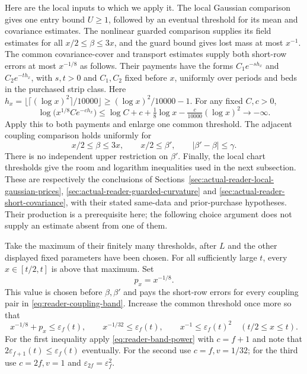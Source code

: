 Here are the local inputs to which we apply it. The local Gaussian
comparison gives one entry bound $U\ge1$, followed by an eventual
threshold for its mean and covariance estimates. The nonlinear
guarded comparison supplies its field estimates for all
$x/2\le\beta\le3x$, and the guard bound gives lost mass at most
$x^{-1}$. The common covariance-cover and transport estimates
supply both short-row errors at most $x^{-1/8}$ as follows. Their
payments have the forms $C_1e^{-s h_x}$ and $C_2e^{-t h_x}$, with
$s,t>0$ and $C_1,C_2$ fixed before $x$, uniformly over periods and
beds in the purchased strip class. Here
$h_x=\lfloor\lceil(\log x)^2\rceil/10000\rfloor
\ge(\log x)^2/10000-1$. For any fixed $C,c>0$,
\[
 \log\bigl(x^{1/8}Ce^{-c h_x}\bigr)
 \le\log C+c+\tfrac18\log x-\tfrac c{10000}(\log x)^2
 \longrightarrow-\infty.
\]
Apply this to both payments and enlarge one common threshold.
The adjacent
coupling comparison holds uniformly for
\begin{equation}\label{eq:reader-coupling-band}
 x/2\le\beta\le3x,\qquad x/2\le\beta',\qquad
 |\beta'-\beta|\le\gamma.
\end{equation}
There is no independent upper restriction on $\beta'$. Finally,
the local chart thresholds give the room and logarithm inequalities
used in the next subsection. These are respectively the conclusions
of Sections~\ref{sec:actual-reader-local-gaussian-prices},
\ref{sec:actual-reader-guarded-curvature} and
\ref{sec:actual-reader-short-covariance}, with their stated
same-data and prior-purchase hypotheses. Their production is a
prerequisite here; the following choice argument does not supply an
estimate absent from one of them.

Take the maximum of their finitely many thresholds, after $L$ and
the other displayed fixed parameters have been chosen. For all
sufficiently large $t$, every $x\in[t/2,t]$ is above that maximum.
Set
\[
 p_x=x^{-1/8}.
\]
This value is chosen before $\beta,\beta'$ and pays the short-row
errors for every coupling pair in \eqref{eq:reader-coupling-band}.
Increase the common threshold once more so that
\begin{equation}\label{eq:reader-common-error-budget}
 x^{-1/8}+p_x\le\varepsilon_f(t),\qquad
 x^{-1/32}\le\varepsilon_f(t),\qquad
 x^{-1}\le\varepsilon_f(t)^2
 \quad(t/2\le x\le t).
\end{equation}
For the first inequality apply \eqref{eq:reader-band-power} with
$c=f+1$ and note that
$2\varepsilon_{f+1}(t)\le\varepsilon_f(t)$ eventually. For the
second use $c=f,v=1/32$; for the third use $c=2f,v=1$ and
$\varepsilon_{2f}=\varepsilon_f^2$.

